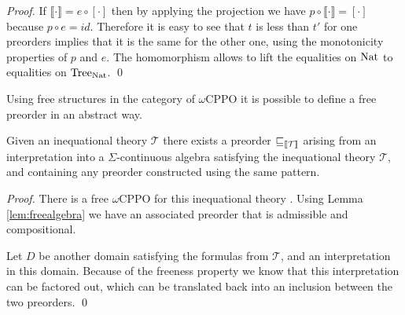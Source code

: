 \begin{proof}
    If $\llbracket \cdot \rrbracket = e \circ [ \cdot ]$ then 
    by applying the projection we have $p \circ \llbracket \cdot \rrbracket
     = [\cdot]$ because $p \circ e = id$. Therefore 
     it is easy to see that $t$ is less than $t'$ for one preorders 
     implies that it is the same for the other one, using the 
     monotonicity properties of $p$ and $e$. The homomorphism 
     allows to lift the equalities on $\textnormal{Nat}$ to equalities on $\textnormal{Tree}_{\textnormal{Nat}}$.
\qed\end{proof}

Using free structures in the category 
of $\omega$CPPO it is possible to define 
a free preorder in an abstract way.

\begin{alemma}
    \label{lem:freedomainpreorder}
    Given an inequational theory $\mathcal{T}$
    there exists a preorder $\sqsubseteq_{\llbracket \mathcal{T} \rrbracket}$
    arising from an interpretation into a $\Sigma$-continuous algebra satisfying the 
    inequational theory $\mathcal{T}$, and containing 
    any preorder constructed using the same pattern.
\end{alemma}

\begin{proof}
    There is a free $\omega$CPPO for this inequational 
    theory \cite{abramsky1994}. Using Lemma \ref{lem:freealgebra}
    we have an associated preorder that is admissible and compositional.
    
    Let $D$ be another domain satisfying the formulas from $\mathcal{T}$,
    and an interpretation in this domain. Because of the 
    freeness property we know that this interpretation 
    can be factored out, which can be translated back into 
    an inclusion between the two preorders.
\qed\end{proof}


